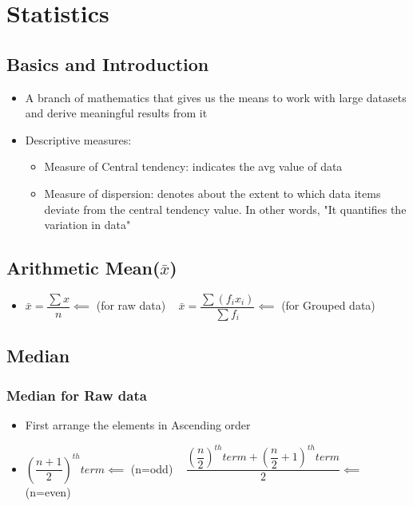 \documentclass[8pt]{report}
\begin{document}
\chapter{Statistics}
		\section{Basics and Introduction}
		\begin{itemize}
			\item A branch of mathematics that gives us the means to work with large datasets and derive meaningful results from it
			\item Descriptive measures:
				\begin{itemize}
					\item Measure of Central tendency: indicates the avg value of data
					\item Measure of dispersion: denotes about the extent to which data items deviate from the central tendency value. In other words, "It quantifies the variation in data"
				\end{itemize}\hrulefill
		\end{itemize}
		\section{Arithmetic Mean($\bar{x}$)}
			\begin{itemize}
				\item $\boxed{\bar{x}=\dfrac{\sum x}{n}}\impliedby$ (for raw data) $\;\;\;\boxed{\bar{x}=\dfrac{\sum (f_ix_i)}{\sum f_i}}\impliedby$ (for Grouped data)
			\end{itemize}\hrulefill
		\section{Median}
		\subsection{Median for Raw data}
			\begin{itemize}
				\item First arrange the elements in Ascending order
				\item $\boxed{\left(\dfrac{n+1}{2}\right)^{th}term}\impliedby$ (n=odd) $\;\;\;\boxed{\dfrac{\left(\dfrac{n}{2}\right)^{th}term+\left(\dfrac{n}{2}+1\right)^{th}term}{2}}\impliedby$ (n=even)
			\end{itemize}\hrulefill\\\\
\end{document}
